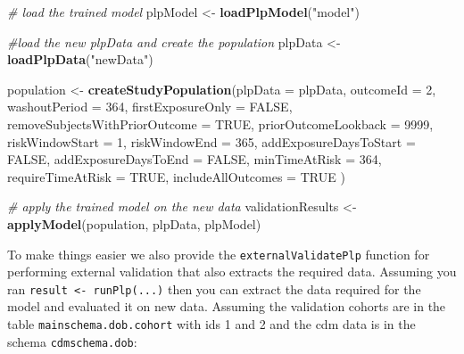 \documentclass[11pt]{book}
\newenvironment{Shaded}{\begin{snugshade}}{\end{snugshade}}
\newcommand{\CommentTok}[1]{\textcolor[rgb]{0.56,0.35,0.01}{\textit{#1}}}
\newcommand{\DataTypeTok}[1]{\textcolor[rgb]{0.13,0.29,0.53}{#1}}
\newcommand{\DecValTok}[1]{\textcolor[rgb]{0.00,0.00,0.81}{#1}}
\newcommand{\KeywordTok}[1]{\textcolor[rgb]{0.13,0.29,0.53}{\textbf{#1}}}
\newcommand{\NormalTok}[1]{#1}
\newcommand{\OtherTok}[1]{\textcolor[rgb]{0.56,0.35,0.01}{#1}}
\newcommand{\StringTok}[1]{\textcolor[rgb]{0.31,0.60,0.02}{#1}}
\theoremstyle{definition}
\theoremstyle{definition}
\theoremstyle{definition}
\theoremstyle{remark}
\begin{document}
\begin{Shaded}
\begin{Highlighting}[]
\CommentTok{# load the trained model}
\NormalTok{plpModel <-}\StringTok{ }\KeywordTok{loadPlpModel}\NormalTok{(}\StringTok{"model"}\NormalTok{)}

\CommentTok{#load the new plpData and create the population}
\NormalTok{plpData <-}\StringTok{ }\KeywordTok{loadPlpData}\NormalTok{(}\StringTok{"newData"}\NormalTok{)}

\NormalTok{population <-}\StringTok{ }\KeywordTok{createStudyPopulation}\NormalTok{(}\DataTypeTok{plpData =}\NormalTok{ plpData,}
                                    \DataTypeTok{outcomeId =} \DecValTok{2}\NormalTok{,}
                                    \DataTypeTok{washoutPeriod =} \DecValTok{364}\NormalTok{,}
                                    \DataTypeTok{firstExposureOnly =} \OtherTok{FALSE}\NormalTok{,}
                                    \DataTypeTok{removeSubjectsWithPriorOutcome =} \OtherTok{TRUE}\NormalTok{,}
                                    \DataTypeTok{priorOutcomeLookback =} \DecValTok{9999}\NormalTok{,}
                                    \DataTypeTok{riskWindowStart =} \DecValTok{1}\NormalTok{,}
                                    \DataTypeTok{riskWindowEnd =} \DecValTok{365}\NormalTok{,}
                                    \DataTypeTok{addExposureDaysToStart =} \OtherTok{FALSE}\NormalTok{,}
                                    \DataTypeTok{addExposureDaysToEnd =} \OtherTok{FALSE}\NormalTok{,}
                                    \DataTypeTok{minTimeAtRisk =} \DecValTok{364}\NormalTok{,}
                                    \DataTypeTok{requireTimeAtRisk =} \OtherTok{TRUE}\NormalTok{,}
                                    \DataTypeTok{includeAllOutcomes =} \OtherTok{TRUE}
\NormalTok{)}

\CommentTok{# apply the trained model on the new data}
\NormalTok{validationResults <-}\StringTok{ }\KeywordTok{applyModel}\NormalTok{(population, plpData, plpModel)}
\end{Highlighting}
\end{Shaded}

To make things easier we also provide the \texttt{externalValidatePlp} function for performing external validation that also extracts the required data. Assuming you ran \texttt{result\ \textless{}-\ runPlp(...)} then you can extract the data required for the model and evaluated it on new data. Assuming the validation cohorts are in the table \texttt{mainschema.dob.cohort} with ids 1 and 2 and the cdm data is in the schema \texttt{cdmschema.dob}:
\end{document}
